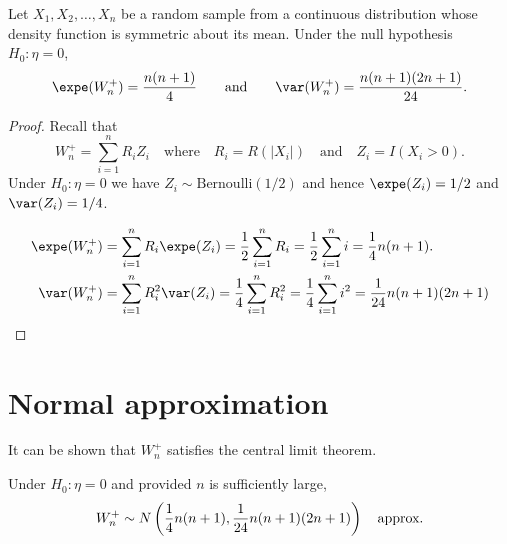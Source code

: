 \begin{theorem}
Let $X_1,X_2,\ldots,X_n$ be a random sample from a continuous distribution whose density function is symmetric about its mean. Under the null hypothesis $H_0:\eta=0$, 
\[
\expe(W^{+}_n) = \frac{n(n+1)}{4} \qquad\text{and}\qquad \var(W^{+}_n)	= \frac{n(n+1)(2n+1)}{24}.
\]
\end{theorem}

\begin{proof}
Recall that 
\[
W^{+}_n = \sum_{i=1}^n R_i Z_i \quad\text{where}\quad R_i = R(|X_i|) \quad\text{and}\quad Z_i=I(X_i>0).
\]
%
Under $H_0:\eta=0$ we have $Z_i\sim\text{Bernoulli}(1/2)$ and hence $\expe(Z_i)=1/2$ and $\var(Z_i)=1/4$. 

\begin{align*}
\expe(W^{+}_n) 
	& = \sum_{i=1}^n R_i\expe(Z_i) 
	= \frac{1}{2}\sum_{i=1}^n R_i
	= \frac{1}{2}\sum_{i=1}^n i
	= \frac{1}{4}n(n+1). \\
\var(W^{+}_n)
	& = \sum_{i=1}^n R_i^2 \var(Z_i) 
	= \frac{1}{4}\sum_{i=1}^n R_i^2
	= \frac{1}{4}\sum_{i=1}^n i^2
	= \frac{1}{24}n(n+1)(2n+1)
\end{align*}
\end{proof}


\section{Normal approximation}
It can be shown that $W^{+}_n$ satisfies the central limit theorem.

\vspace*{2ex}
Under $H_0:\eta=0$ and provided $n$ is sufficiently large,
\[
W^{+}_n \sim N\left(\frac{1}{4}n(n+1), \frac{1}{24}n(n+1)(2n+1)\right) \text{\quad approx.}
\]

